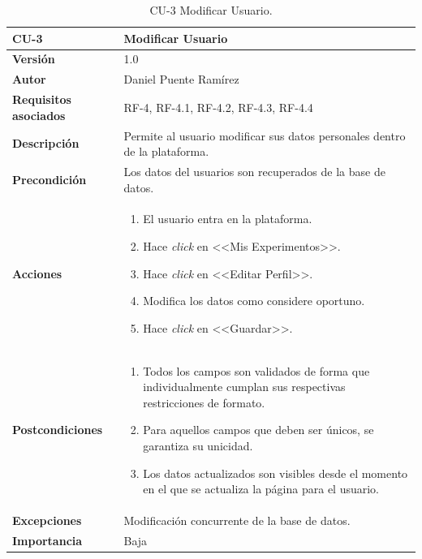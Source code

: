 \begin{table}[p]
\centering
\begin{tabularx}{\linewidth}{ p{} p{} }
\toprule
\textbf{CU-3} & \textbf{Modificar Usuario}\\
\toprule
\textbf{Versión} & 1.0\\
\textbf{Autor} & Daniel Puente Ramírez\\
\textbf{Requisitos asociados} & RF-4, RF-4.1, RF-4.2, RF-4.3, RF-4.4\\
\textbf{Descripción} & Permite al usuario modificar sus datos personales dentro de la plataforma.\\
\textbf{Precondición} & Los datos del usuarios son recuperados de la base de datos.\\
\textbf{Acciones} &
\begin{enumerate}
\def\labelenumi{\arabic{enumi}.}
\tightlist
\item El usuario entra en la plataforma.
\item Hace \textit{click} en <<Mis Experimentos>>.
\item Hace \textit{click} en <<Editar Perfil>>.
\item Modifica los datos como considere oportuno.
\item Hace \textit{click} en <<Guardar>>.
\end{enumerate}\\
\textbf{Postcondiciones} & 
\begin{enumerate}
\tightlist
\item Todos los campos son validados de forma que individualmente cumplan sus respectivas restricciones de formato.
\item Para aquellos campos que deben ser únicos, se garantiza su unicidad.
\item Los datos actualizados son visibles desde el momento en el que se actualiza la página para el usuario.
\end{enumerate}\\
\textbf{Excepciones} & Modificación concurrente de la base de datos.\\
\textbf{Importancia} & Baja \\
\bottomrule
\end{tabularx}
\caption{CU-3 Modificar Usuario.}
\end{table}

